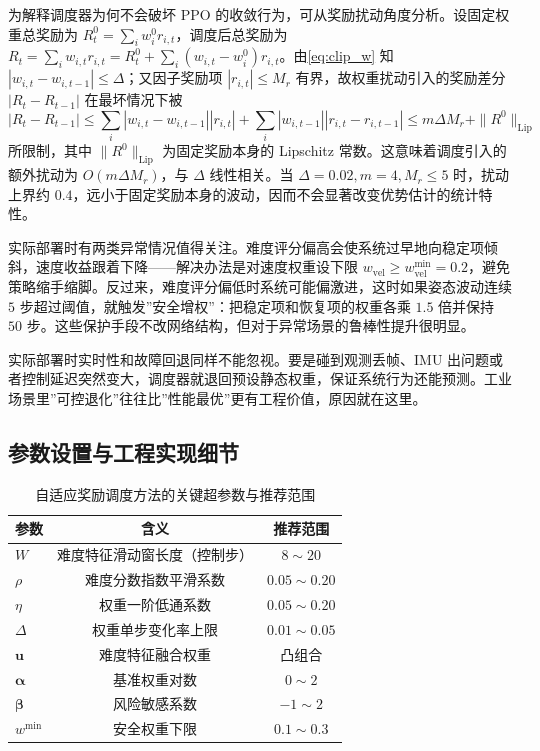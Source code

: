 \documentclass[12pt,a4paper]{ctexart}
\numberwithin{equation}{section}
\numberwithin{table}{section}
\numberwithin{figure}{section}
\newcommand{\subtopic}[1]{\par\addvspace{0.2\baselineskip}\ignorespaces}
\begin{document}
\subtopic{稳定性分析}
为解释调度器为何不会破坏 PPO 的收敛行为，可从奖励扰动角度分析。设固定权重总奖励为 $R_t^{0}=\sum_i w_i^0 r_{i,t}$，调度后总奖励为 $R_t=\sum_i w_{i,t} r_{i,t}=R_t^0+\sum_i(w_{i,t}-w_i^0)r_{i,t}$。由\eqref{eq:clip_w} 知 $|w_{i,t}-w_{i,t-1}|\le\Delta$；又因子奖励项 $|r_{i,t}|\le M_r$ 有界，故权重扰动引入的奖励差分 $|R_t-R_{t-1}|$ 在最坏情况下被
\begin{equation}
|R_t-R_{t-1}|\le \sum_i|w_{i,t}-w_{i,t-1}||r_{i,t}|+\sum_i|w_{i,t-1}||r_{i,t}-r_{i,t-1}|\le m\Delta M_r+\|R^0\|_{\text{Lip}}
\end{equation}
所限制，其中 $\|R^0\|_{\text{Lip}}$ 为固定奖励本身的 Lipschitz 常数。这意味着调度引入的额外扰动为 $O(m\Delta M_r)$，与 $\Delta$ 线性相关。当 $\Delta=0.02,m=4,M_r\le 5$ 时，扰动上界约 $0.4$，远小于固定奖励本身的波动，因而不会显著改变优势估计的统计特性。

\subtopic{异常保护与回退机制}
实际部署时有两类异常情况值得关注。难度评分偏高会使系统过早地向稳定项倾斜，速度收益跟着下降——解决办法是对速度权重设下限 $w_{\text{vel}}\ge w_{\text{vel}}^{\min}=0.2$，避免策略缩手缩脚。反过来，难度评分偏低时系统可能偏激进，这时如果姿态波动连续 $5$ 步超过阈值，就触发”安全增权”：把稳定项和恢复项的权重各乘 $1.5$ 倍并保持 $50$ 步。这些保护手段不改网络结构，但对于异常场景的鲁棒性提升很明显。

实际部署时实时性和故障回退同样不能忽视。要是碰到观测丢帧、IMU 出问题或者控制延迟突然变大，调度器就退回预设静态权重，保证系统行为还能预测。工业场景里”可控退化”往往比”性能最优”更有工程价值，原因就在这里。

\subsection{参数设置与工程实现细节}
\subtopic{参数推荐范围}
\begin{table}[H]
\centering
\caption{自适应奖励调度方法的关键超参数与推荐范围}
\label{tab:hyperparams}
\begin{tabular}{lcc}
\toprule
参数 & 含义 & 推荐范围 \\
\midrule
$W$ & 难度特征滑动窗长度（控制步） & $8\sim20$ \\
$\rho$ & 难度分数指数平滑系数 & $0.05\sim0.20$ \\
$\eta$ & 权重一阶低通系数 & $0.05\sim0.20$ \\
$\Delta$ & 权重单步变化率上限 & $0.01\sim0.05$ \\
$\bm{u}$ & 难度特征融合权重 & 凸组合 \\
$\bm{\alpha}$ & 基准权重对数 & $0\sim2$ \\
$\bm{\beta}$ & 风险敏感系数 & $-1\sim2$ \\
$w^{\min}$ & 安全权重下限 & $0.1\sim0.3$ \\
\bottomrule
\end{tabular}
\end{table}
\end{document}
